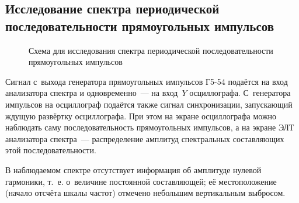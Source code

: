 \subsection*{Исследование спектра периодической последовательности прямоугольных импульсов}



\begin{figure}
	\label{fig:2}
	\caption{Схема для исследования спектра периодической последовательности прямоугольных импульсов}
\end{figure}

Сигнал с~выхода генератора прямоугольных импульсов Г5-54 подаётся на вход анализатора спектра и одновременно~--- на вход~$Y$ осциллографа. С~генератора импульсов на осциллограф подаётся также сигнал синхронизации, запускающий ждущую развёртку осциллографа. При этом на экране осциллографа можно наблюдать саму последовательность прямоугольных импульсов, а на экране ЭЛТ анализатора спектра~--- распределение амплитуд спектральных составляющих этой последовательности.

В наблюдаемом спектре отсутствует информация об амплитуде нулевой гармоники, т.~е. о~величине постоянной составляющей; её местоположение (начало отсчёта шкалы частот) отмечено небольшим вертикальным выбросом.

